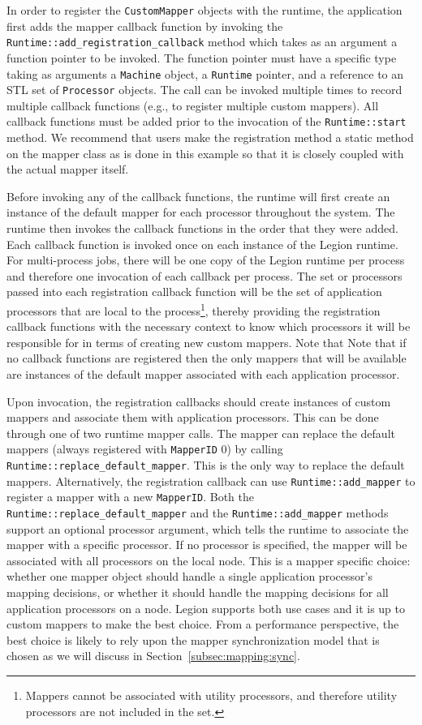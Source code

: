 In order to register the {\tt CustomMapper} objects with the runtime, the
application first adds the mapper callback function by invoking the
{\tt Runtime::add\_registration\_callback} method which takes as an
argument a function pointer to be invoked. The function pointer must
have a specific type taking as arguments a {\tt Machine} object, 
a {\tt Runtime} pointer, and a reference to an STL set of {\tt Processor}
objects. The call can be invoked multiple times to record multiple
callback functions (e.g., to register multiple custom mappers). All
callback functions must be added prior to the invocation of the 
{\tt Runtime::start} method. We recommend that users make the registration
method a static method on the mapper class as is done in this example
so that it is closely coupled with the actual mapper itself.

Before invoking any of the callback functions, the runtime will first
create an instance of the default mapper for each processor throughout
the system. The runtime then invokes the callback functions in the order
that they were added. Each callback function is invoked once on each 
instance of the Legion runtime. For multi-process jobs, there will be 
one copy of the Legion runtime per process and therefore one invocation
of each callback per process. The set or processors passed into each 
registration callback function will be the set of application processors 
that are local to the process\footnote{Mappers cannot be associated with
utility processors, and therefore utility processors are not included
in the set.}, thereby providing the registration callback
functions with the necessary context to know which processors it will
be responsible for in terms of creating new custom mappers. Note that
Note that if no callback functions are registered then the only mappers
that will be available are instances of the default mapper associated
with each application processor.

Upon invocation, the registration callbacks should create instances
of custom mappers and associate them with application processors. 
This can be done through one of two runtime mapper calls. The mapper
can replace the default mappers (always registered with {\tt MapperID}
0) by calling {\tt Runtime::replace\_default\_mapper}. This is the
only way to replace the default mappers. Alternatively, the registration
callback can use {\tt Runtime::add\_mapper} to register a mapper with a
new {\tt MapperID}. Both the {\tt Runtime::replace\_default\_mapper} and
the {\tt Runtime::add\_mapper} methods support an optional processor
argument, which tells the runtime to associate the mapper with a specific
processor. If no processor is specified, the mapper will be associated 
with all processors on the local node. This is a mapper specific choice:
whether one mapper object should handle a single application processor's
mapping decisions, or whether it should handle the mapping decisions for
all application processors on a node. Legion supports both use cases
and it is up to custom mappers to make the best choice. From a performance
perspective, the best choice is likely to rely upon the mapper synchronization
model that is chosen as we will discuss in Section~\ref{subsec:mapping:sync}.

